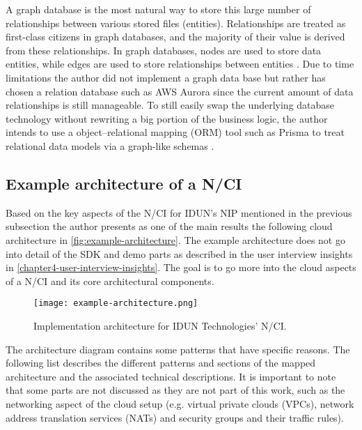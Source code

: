 A graph database is the most natural way to store this large number of relationships between various stored files (entities). Relationships are treated as first-class citizens in graph databases, and the majority of their value is derived from these relationships. In graph databases, nodes are used to store data entities, while edges are used to store relationships between entities \citep{amazon_web_services_inc_what_nodate}. Due to time limitations the author did not implement a graph data base but rather has chosen a relation database such as AWS Aurora since the current amount of data relationships is still manageable. To still easily swap the underlying database technology without rewriting a big portion of the business logic, the author intends to use a object–relational mapping (ORM) tool such as Prisma to treat relational data models via a graph-like schemas \citep{prisma_data_nodate}.

\subsection{Example architecture of a N/CI}
\label{chapter5-example-architecture-of-a-nci}

Based on the key aspects of the N/CI for IDUN's NIP mentioned in the previous subsection the author presents as one of the main results the following cloud architecture in \autoref{fig:example-architecture}. The example architecture does not go into detail of the SDK and demo parts as described in the user interview insights in \autoref{chapter4-user-interview-insights}. The goal is to go more into the cloud aspects of a N/CI and its core architectural components.

\begin{figure}[!ht]
  \centering
  \texttt{[image: example-architecture.png]}
  \caption{Implementation architecture for IDUN Technologies' N/CI.}
  \label{fig:example-architecture}
\end{figure}

The architecture diagram contains some patterns that have specific reasons. The following list describes the different patterns and sections of the mapped architecture and the associated technical descriptions. It is important to note that some parts are not discussed as they are not part of this work, such as the networking aspect of the cloud setup (e.g. virtual private clouds (VPCs), network address translation services (NATs) and security groups and their traffic rules).

